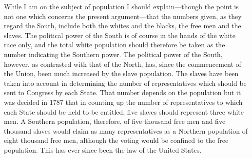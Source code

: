 While I am on the subject of population I should explain---though
the point is not one which concerns the present argument---that the
numbers given, as they regard the South, include both the whites
and the blacks, the free men and the slaves.  The political power
of the South is of course in the hands of the white race only, and
the total white population should therefore be taken as the number
indicating the Southern power.  The political power of the South,
however, as contrasted with that of the North, has, since the
commencement of the Union, been much increased by the slave
population.  The slaves have been taken into account in determining
the number of representatives which should be sent to Congress by
each State.  That number depends on the population but it was
decided in 1787 that in counting up the number of representatives
to which each State should be held to be entitled, five slaves
should represent three white men.  A Southern population,
therefore, of five thousand free men and five thousand slaves would
claim as many representatives as a Northern population of eight
thousand free men, although the voting would be confined to the
free population.  This has ever since been the law of the United
States.

